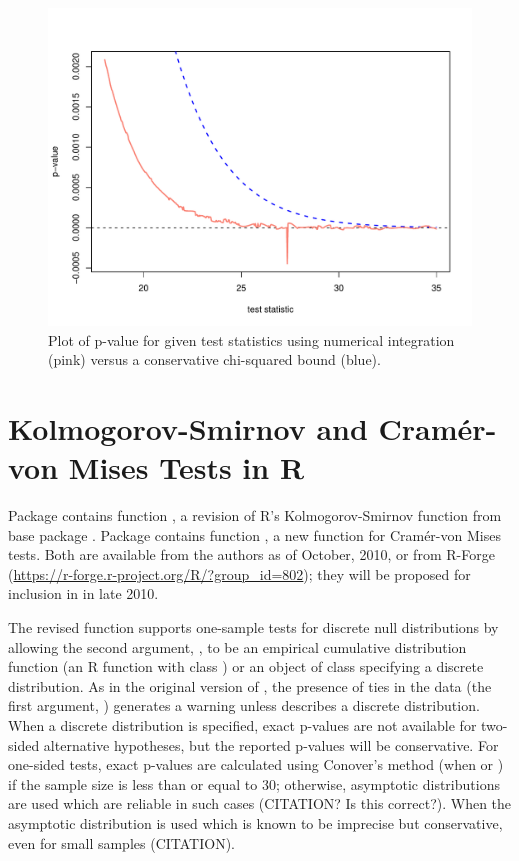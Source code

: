 \begin{figure}
\begin{center}
\includegraphics[scale=0.4]{fig1.pdf}
\end{center}
\caption{Plot of p-value for given test statistics using numerical integration (pink) versus a conservative
         chi-squared bound (blue). }
\label{cvmissues}
\end{figure}


\section{Kolmogorov-Smirnov and Cram\'{e}r-von Mises Tests in R}

Package  contains function , a revision of
R's Kolmogorov-Smirnov function  from base
package .
Package  contains function , a new
function for Cram\'{e}r-von Mises tests.  Both are available from the authors
as of October, 2010,
or from R-Forge (\url{https://r-forge.r-project.org/R/?group_id=802});
they will be proposed for inclusion in  in late 2010.

The revised  function supports one-sample tests for discrete
null distributions by allowing the second argument, , to be
an empirical cumulative distribution function (an R function
with class ) or an object of class  specifying
a discrete distribution.  As in the original version of ,
the presence of ties in the data (the first argument, ) generates a
warning unless  describes a discrete distribution.  When a discrete
distribution is specified, exact p-values are not available for 
two-sided alternative hypotheses, but the reported p-values will be
conservative.  For one-sided tests,
exact p-values are calculated using Conover's
method (when  or )
if the sample size is less than or equal to 30; otherwise, asymptotic distributions
are used which are reliable in such cases (CITATION? Is this correct?).
When  the asymptotic distribution is used which is known
to be imprecise but conservative, even for small samples (CITATION).


